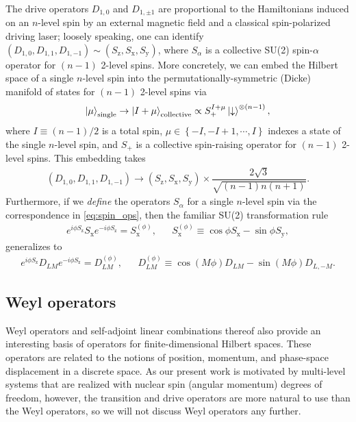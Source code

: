 \documentclass[nofootinbib,notitlepage,11pt]{revtex4-2}
\renewcommand{\t}{\text} %
\newcommand{\f}[2]{\dfrac{#1}{#2}} %
\newcommand{\p}[1]{\left(#1\right)} %
\renewcommand{\set}[1]{\left\{#1\right\}} %
\newcommand{\1}{\mathds{1}}
\newcommand{\dn}{\downarrow}
\newcommand{\x}{\text{x}}
\newcommand{\y}{\text{y}}
\newcommand{\z}{\text{z}}
\begin{document}
The drive operators $D_{1,0}$ and $D_{1,\pm1}$ are proportional to the
Hamiltonians induced on an $n$-level spin by an external magnetic
field and a classical spin-polarized driving laser; loosely speaking,
one can identify $\p{D_{1,0},D_{1,1},D_{1,-1}}\sim\p{S_\z,S_\x,S_\y}$,
where $S_\alpha$ is a collective SU(2) spin-$\alpha$ operator for
$\p{n-1}$ 2-level spins\cite{perlin2019shorttime}.  More concretely,
we can embed the Hilbert space of a single $n$-level spin into the
permutationally-symmetric (Dicke) manifold of states for $\p{n-1}$
2-level spins via
\begin{align}
  \ket{\mu}_{\t{single}} \to \ket{I+\mu}_{\t{collective}}
  \propto S_+^{I+\mu} \ket\dn^{\otimes\p{n-1}},
\end{align}
where $I\equiv\p{n-1}/2$ is a total spin,
$\mu\in\set{-I,-I+1,\cdots,I}$ indexes a state of the single $n$-level
spin, and $S_+$ is a collective spin-raising operator for $\p{n-1}$
2-level spins.  This embedding takes
\begin{align}
  \p{D_{1,0},D_{1,1},D_{1,-1}}
  \to \p{S_\z,S_\x,S_\y}
  \times \f{2\sqrt{3}}{\sqrt{\p{n-1}n\p{n+1}}}.
  \label{eq:spin_ops}
\end{align}
Furthermore, if we {\it define} the operators $S_\alpha$ for a single
$n$-level spin via the correspondence in \eqref{eq:spin_ops}, then the
familiar SU(2) transformation rule
\begin{align}
  e^{i\phi S_\z} S_\x e^{-i\phi S_\z} = S_\x^{(\phi)},
  &&
  S_\x^{(\phi)} \equiv \cos\phi S_\x - \sin\phi S_\y,
\end{align}
generalizes to
\begin{align}
  e^{i\phi S_\z} D_{LM} e^{-i\phi S_\z} = D_{LM}^{(\phi)},
  &&
  D_{LM}^{(\phi)} \equiv \cos\p{M\phi} D_{LM} - \sin\p{M\phi} D_{L,-M}.
\end{align}

\subsection{Weyl operators}

Weyl operators\cite{bertlmann2008bloch} and self-adjoint linear
combinations thereof\cite{asadian2016heisenbergweyl} also provide an
interesting basis of operators for finite-dimensional Hilbert spaces.
These operators are related to the notions of position, momentum, and
phase-space displacement in a discrete space.  As our present work is
motivated by multi-level systems that are realized with nuclear spin
(angular momentum) degrees of freedom, however, the transition and
drive operators are more natural to use than the Weyl operators, so we
will not discuss Weyl operators any further.
\end{document}
